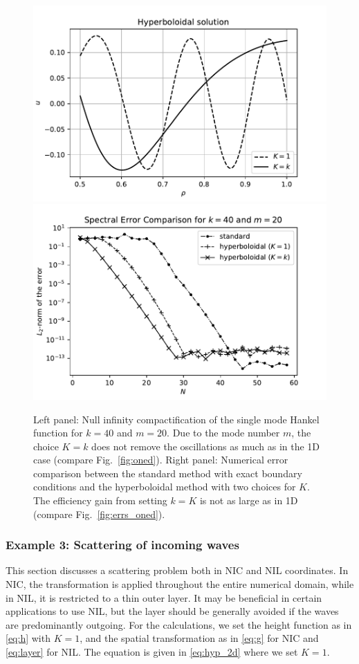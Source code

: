 \documentclass[draft,onefignum,onetabnum]{siamart190516}
\begin{document}
\begin{figure}[tbhp]
	\centering
	\includegraphics[scale=0.4]{figs/hyp_twod}
	\includegraphics[scale=0.4]{figs/sp_err_2d}
	\caption{Left panel: Null infinity compactification of the single mode Hankel function for $k=40$ and $m=20$. Due to the mode number $m$, the choice $K=k$ does not remove the oscillations as much as in the 1D case (compare Fig.~\ref{fig:oned}). Right panel: Numerical error comparison between the standard method with exact boundary conditions and the hyperboloidal method with two choices for $K$. The efficiency gain from setting $k=K$ is not as large as in 1D (compare Fig.~\ref{fig:errs_oned}). }
	\label{fig:twod}
\end{figure}



\subsubsection{Example 3: Scattering of incoming waves}
This section discusses a scattering problem both in NIC and NIL coordinates. In NIC, the transformation is applied throughout the entire numerical domain, while in NIL, it is restricted to a thin outer layer.  It may be beneficial in certain applications to use NIL, but the layer should be generally avoided if the waves are predominantly outgoing. For the calculations, we set the height function as in \eqref{eq:h} with $K=1$,  and the spatial transformation as in \eqref{eq:g} for NIC and \eqref{eq:layer} for NIL. The equation is given in \eqref{eq:hyp_2d} where we set $K=1$.
\end{document}
